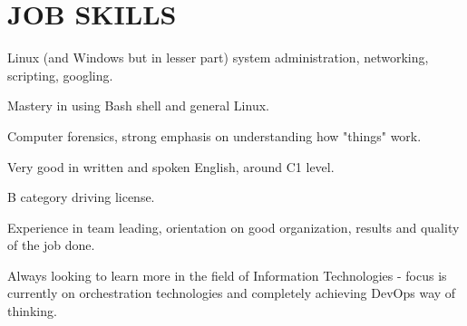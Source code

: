 \documentclass{cv}
\begin{document}
\section{JOB SKILLS}
Linux (and Windows but in lesser part) system administration, networking, scripting, googling.

Mastery in using Bash shell and general Linux.

Computer forensics, strong emphasis on understanding how "things" work.

Very good in written and spoken English, around C1 level.

B category driving license.

Experience in team leading, orientation on good organization, results and quality of the job done.

Always looking to learn more in the field of Information Technologies - focus is currently on orchestration technologies and completely achieving DevOps way of thinking.
\end{document}
